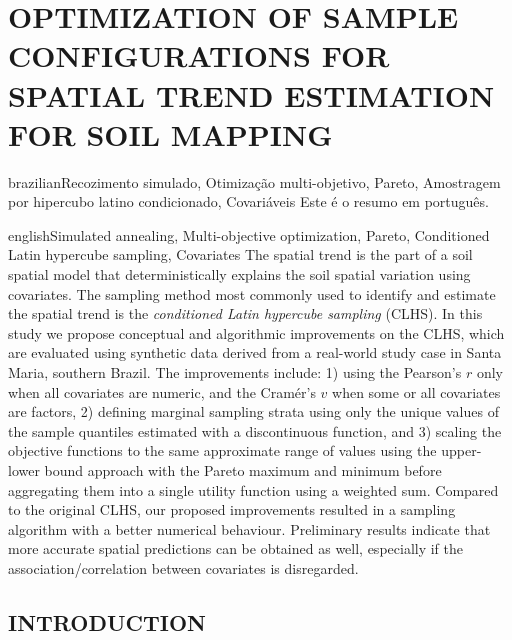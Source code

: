 \artigotrue
\chapter{OPTIMIZATION OF SAMPLE CONFIGURATIONS FOR SPATIAL TREND ESTIMATION FOR SOIL MAPPING}
\label{chap:chap08}

\def\ptkeys{Recozimento simulado, Otimização multi-objetivo, Pareto, Amostragem por hipercubo latino 
condicionado, Covariáveis}

\begin{chapterabstract}{brazilian}{\ptkeys}
Este é o resumo em português.
\end{chapterabstract}

\def\enkeys{Simulated annealing, Multi-objective optimization, Pareto, Conditioned Latin hypercube sampling, 
Covariates}
  
\begin{chapterabstract}{english}{\enkeys}
The spatial trend is the part of a soil spatial model that deterministically explains the soil spatial 
variation using covariates. The sampling method most commonly used to identify and estimate the spatial trend 
is the \emph{conditioned Latin hypercube sampling} (CLHS). In this study we propose conceptual and algorithmic 
improvements on the CLHS, which are evaluated using synthetic data derived from a real-world study case in 
Santa Maria, southern Brazil. The improvements include: 1) using the Pearson's $r$ only when all covariates 
are numeric, and the Cramér's $v$ when some or all covariates are factors, 2) defining marginal sampling 
strata using only the unique values of the sample quantiles estimated with a discontinuous function, and 3) 
scaling the objective functions to the same approximate range of values using the upper-lower bound approach 
with the Pareto maximum and minimum before aggregating them into a single utility function using a weighted 
sum. Compared to the original CLHS, our proposed improvements resulted in a sampling algorithm with a better 
numerical behaviour. Preliminary results indicate that more accurate spatial predictions can be obtained as 
well, 
especially if the association/correlation between covariates is disregarded.
\end{chapterabstract}

\formatchapter

\section{INTRODUCTION}
\label{sec:chap08-intro}

